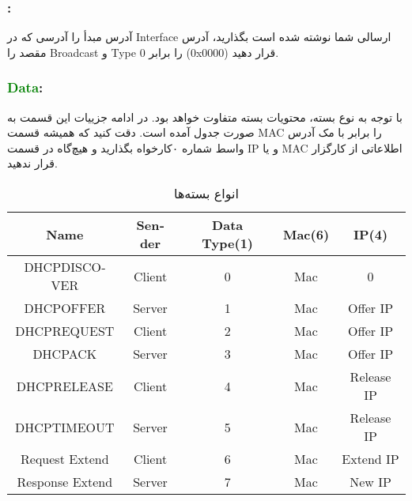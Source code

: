 \subsubsection{
\textcolor{purple}{}:
}
آدرس مبدأ را آدرسی که در Interface ارسالی شما نوشته شده است بگذارید، آدرس مقصد را Broadcast و Type را برابر 0
(0x0000)
 قرار دهید.

\subsubsection{
\textcolor{green}{Data}:
}
با توجه به نوع بسته، محتویات بسته متفاوت خواهد بود. در ادامه جزییات این قسمت به صورت جدول آمده است. دقت کنید که همیشه قسمت MAC را برابر با مک آدرس واسط شماره ۰کارخواه بگذارید و هیچ‌گاه در قسمت IP و یا MAC اطلاعاتی از کارگزار قرار ندهید.

\begin{table}[htb]
\centering
  \begin{latin}
    \begin{tabular}{|c|c|c|c|c|}
     \hline
      Name & Sender & Data Type(1) & Mac(6) & IP(4) \\
      \hline
      DHCPDISCOVER& Client & 0 & Mac & 0 \\
      \hline
      DHCPOFFER & Server & 1 & Mac & Offer IP \\
      \hline
      DHCPREQUEST & Client & 2 & Mac & Offer IP \\
      \hline
      DHCPACK & Server & 3 & Mac & Offer IP \\
      \hline
      DHCPRELEASE & Client & 4 & Mac & Release IP \\
      \hline
      DHCPTIMEOUT & Server & 5 & Mac & Release IP \\
      \hline
      Request Extend & Client & 6 & Mac & Extend IP \\
      \hline
      Response Extend  & Server & 7 & Mac & New IP \\
      \hline
    \end{tabular}
  \end{latin}
\caption{انواع بسته‌ها}
\end{table}
